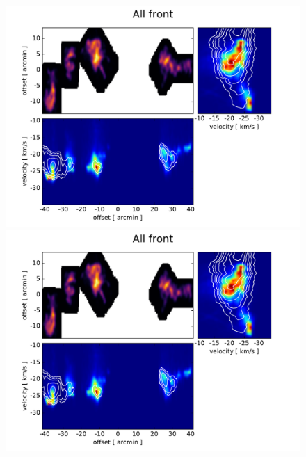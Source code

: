 \documentclass[traditabstract]{aa}
\begin{document}
\begin{figure}[h]
  \centering
  \includegraphics[page=7,width=14cm,trim=30 10 55 30,clip=true]{Figures/PV_diagrams_CO.pdf} \\
  \includegraphics[page=3,width=14cm,trim=30 10 55 30,clip=true]{Figures/PV_diagrams_CO.pdf}
  \caption{}
\end{figure}
\end{document}
